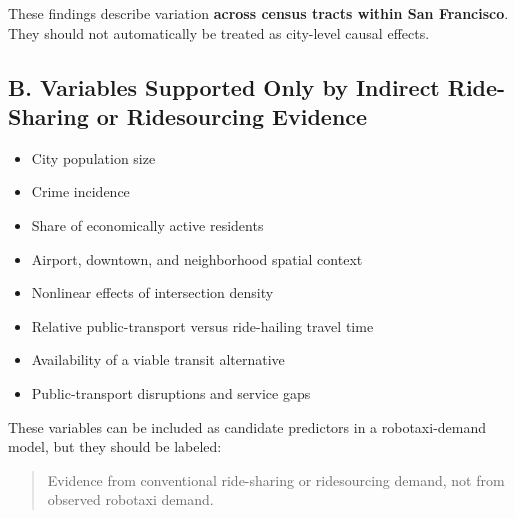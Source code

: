 \documentclass[10pt,a4paper]{article}
\providecommand{\tightlist}{\setlength{\itemsep}{0pt}\setlength{\parskip}{0pt}}
\begin{document}
These findings describe variation \textbf{across census tracts within San Francisco}. They should not automatically be treated as city-level causal effects.

\hypertarget{b.-variables-supported-only-by-indirect-ride-sharing-or-ridesourcing-evidence}{%
\subsection{B. Variables Supported Only by Indirect Ride-Sharing or Ridesourcing Evidence}\label{b.-variables-supported-only-by-indirect-ride-sharing-or-ridesourcing-evidence}}

\begin{itemize}
\tightlist
\item
  City population size
\item
  Crime incidence
\item
  Share of economically active residents
\item
  Airport, downtown, and neighborhood spatial context
\item
  Nonlinear effects of intersection density
\item
  Relative public-transport versus ride-hailing travel time
\item
  Availability of a viable transit alternative
\item
  Public-transport disruptions and service gaps
\end{itemize}

These variables can be included as candidate predictors in a robotaxi-demand model, but they should be labeled:

\begin{quote}
Evidence from conventional ride-sharing or ridesourcing demand, not from observed robotaxi demand.
\end{quote}
\end{document}

